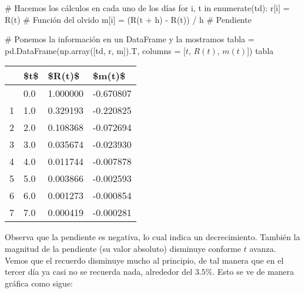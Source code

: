 \documentclass[
  letterpaper,
  DIV=11,
  numbers=noendperiod]{scrreprt}
\newenvironment{Shaded}{\begin{snugshade}}{\end{snugshade}}
\newcommand{\BuiltInTok}[1]{\textcolor[rgb]{0.00,0.23,0.31}{#1}}
\newcommand{\CommentTok}[1]{\textcolor[rgb]{0.37,0.37,0.37}{#1}}
\newcommand{\ControlFlowTok}[1]{\textcolor[rgb]{0.00,0.23,0.31}{#1}}
\newcommand{\KeywordTok}[1]{\textcolor[rgb]{0.00,0.23,0.31}{#1}}
\newcommand{\NormalTok}[1]{\textcolor[rgb]{0.00,0.23,0.31}{#1}}
\newcommand{\OperatorTok}[1]{\textcolor[rgb]{0.37,0.37,0.37}{#1}}
\newcommand{\StringTok}[1]{\textcolor[rgb]{0.13,0.47,0.30}{#1}}
\begin{document}
\begin{Shaded}
\begin{Highlighting}[]
\CommentTok{\# Hacemos los cálculos en cada uno de los días}
\ControlFlowTok{for}\NormalTok{ i, t }\KeywordTok{in} \BuiltInTok{enumerate}\NormalTok{(td):}
\NormalTok{    r[i] }\OperatorTok{=}\NormalTok{ R(t)                  }\CommentTok{\# Función del olvido}
\NormalTok{    m[i] }\OperatorTok{=}\NormalTok{ (R(t }\OperatorTok{+}\NormalTok{ h) }\OperatorTok{{-}}\NormalTok{ R(t)) }\OperatorTok{/}\NormalTok{ h }\CommentTok{\# Pendiente}

\CommentTok{\# Ponemos la información en un DataFrame y la mostramos}
\NormalTok{tabla }\OperatorTok{=}\NormalTok{ pd.DataFrame(np.array([td, r, m]).T, }
\NormalTok{                     columns }\OperatorTok{=}\NormalTok{ [}\StringTok{\textquotesingle{}$t$\textquotesingle{}}\NormalTok{, }\StringTok{\textquotesingle{}$R(t)$\textquotesingle{}}\NormalTok{, }\StringTok{\textquotesingle{}$m(t)$\textquotesingle{}}\NormalTok{])}
\NormalTok{tabla}
\end{Highlighting}
\end{Shaded}

\begin{longtable}[]{@{}llll@{}}
\toprule\noalign{}
& \$t\$ & \$R(t)\$ & \$m(t)\$ \\
\midrule\noalign{}
\endhead
\bottomrule\noalign{}
\endlastfoot
0 & 0.0 & 1.000000 & -0.670807 \\
1 & 1.0 & 0.329193 & -0.220825 \\
2 & 2.0 & 0.108368 & -0.072694 \\
3 & 3.0 & 0.035674 & -0.023930 \\
4 & 4.0 & 0.011744 & -0.007878 \\
5 & 5.0 & 0.003866 & -0.002593 \\
6 & 6.0 & 0.001273 & -0.000854 \\
7 & 7.0 & 0.000419 & -0.000281 \\
\end{longtable}

Observa que la pendiente es negativa, lo cual indica un decrecimiento.
También la magnitud de la pendiente (su valor absoluto) disminuye
conforme \(t\) avanza. Vemos que el recuerdo disminuye mucho al
principio, de tal manera que en el tercer día ya casi no se recuerda
nada, alrededor del \(3.5\%\). Esto se ve de manera gráfica como sigue:
\end{document}
